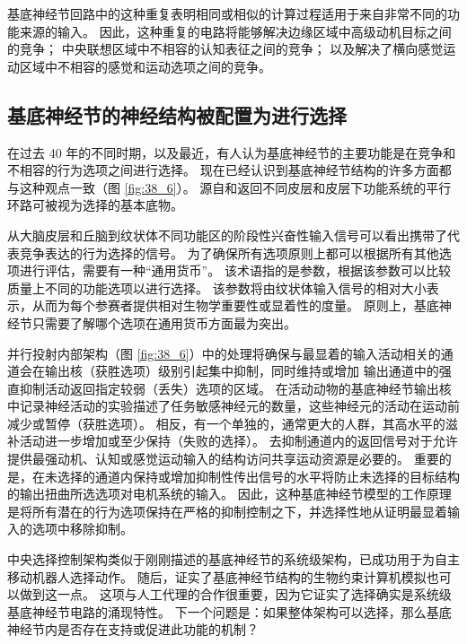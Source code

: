 基底神经节回路中的这种重复表明相同或相似的计算过程适用于来自非常不同的功能来源的输入。 因此，这种重复的电路将能够解决边缘区域中高级动机目标之间的竞争； 中央联想区域中不相容的认知表征之间的竞争； 以及解决了横向感觉运动区域中不相容的感觉和运动选项之间的竞争。

\subsection{基底神经节的神经结构被配置为进行选择}
在过去 40 年的不同时期，以及最近，有人认为基底神经节的主要功能是在竞争和不相容的行为选项之间进行选择。 现在已经认识到基底神经节结构的许多方面都与这种观点一致（图 \ref{fig:38_6}）。 源自和返回不同皮层和皮层下功能系统的平行环路可被视为选择的基本底物。

从大脑皮层和丘脑到纹状体不同功能区的阶段性兴奋性输入信号可以看出携带了代表竞争表达的行为选择的信号。 为了确保所有选项原则上都可以根据所有其他选项进行评估，需要有一种“通用货币”。 该术语指的是参数，根据该参数可以比较质量上不同的功能选项以进行选择。 该参数将由纹状体输入信号的相对大小表示，从而为每个参赛者提供相对生物学重要性或显着性的度量。 原则上，基底神经节只需要了解哪个选项在通用货币方面最为突出。


并行投射内部架构（图 \ref{fig:38_6}）中的处理将确保与最显着的输入活动相关的通道会在输出核（获胜选项）级别引起集中抑制，同时维持或增加 输出通道中的强直抑制活动返回指定较弱（丢失）选项的区域。 在活动动物的基底神经节输出核中记录神经活动的实验描述了任务敏感神经元的数量，这些神经元的活动在运动前减少或暂停（获胜选项）。 相反，有一个单独的，通常更大的人群，其高水平的滋补活动进一步增加或至少保持（失败的选择）。 去抑制通道内的返回信号对于允许提供最强动机、认知或感觉运动输入的结构访问共享运动资源是必要的。 重要的是，在未选择的通道内保持或增加抑制性传出信号的水平将防止未选择的目标结构的输出扭曲所选选项对电机系统的输入。 因此，这种基底神经节模型的工作原理是将所有潜在的行为选项保持在严格的抑制控制之下，并选择性地从证明最显着输入的选项中移除抑制。

中央选择控制架构类似于刚刚描述的基底神经节的系统级架构，已成功用于为自主移动机器人选择动作。 随后，证实了基底神经节结构的生物约束计算机模拟也可以做到这一点。 这项与人工代理的合作很重要，因为它证实了选择确实是系统级基底神经节电路的涌现特性。 下一个问题是：如果整体架构可以选择，那么基底神经节内是否存在支持或促进此功能的机制？

